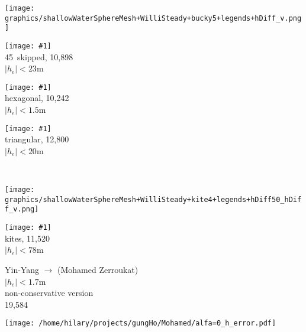 \begin{slide}

\newcommand{\figWidth}{0.3\linewidth}
\raggedright

\newcommand{\subfig}[4]{
\begin{minipage}{\figWidth}\centering
\texttt{[image: \#1]}\\
#2 \\ \small $|h_e|\lt #3$m%
\end{minipage}
}

\begin{minipage}{0.04\linewidth}
\texttt{[image: graphics/shallowWaterSphereMesh+WilliSteady+bucky5+legends+hDiff\_v.png]}
\end{minipage}
%
\subfig{graphics/shallowWaterSphereMesh+WilliSteady+48x96_V_45+save+CN_dt1hr_midPointpv_sample+432000+hDiff.png}
{45\de\ skipped, 10,898 \dofs}{23}{4}
%
\subfig{graphics/shallowWaterSphereMesh+WilliSteady+bucky5+save+CN_dt1hr_midPointpv_sample+432000+hDiff.png}
{hexagonal, 10,242 \dofs}{1.5}{0.36}
%
\subfig{graphics/shallowWaterSphereMesh+WilliSteady+tri5+save+CN_dt1hr_midPointpv_sample+432000+hDiff.png}
{triangular, 12,800 \dofs}{20}{13}
\\
\begin{minipage}{0.04\linewidth}
\texttt{[image: graphics/shallowWaterSphereMesh+WilliSteady+kite4+legends+hDiff50\_hDiff\_v.png]}
\end{minipage}
%
\subfig{graphics/shallowWaterSphereMesh+WilliSteady+kite4+save+CN_dt1hr_midPointpv_sample+432000+hDiff50.png}
{kites, 11,520 \dofs}{78}{20}
%
\begin{minipage}{0.19\linewidth}
Yin-Yang $\rightarrow$ (Mohamed Zerroukat)\\
{\small $|h_e|\lt 1.7$m} \\
non-conservative version \\
19,584 \dofs
\end{minipage}
\begin{minipage}{0.4\linewidth}
\texttt{[image: /home/hilary/projects/gungHo/Mohamed/alfa=0\_h\_error.pdf]}
\end{minipage}

\end{slide}

